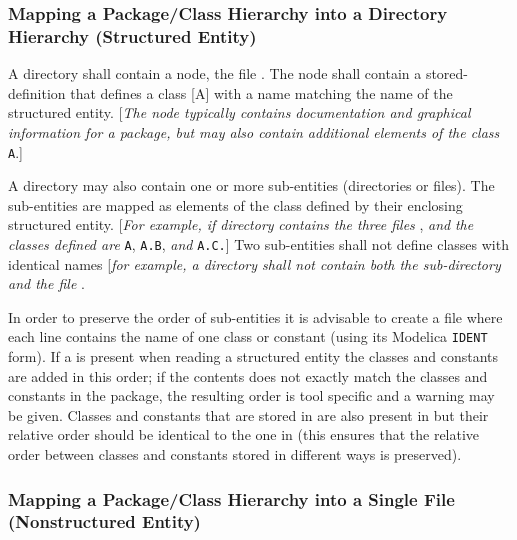 \subsubsection{Mapping a Package/Class Hierarchy into a Directory Hierarchy (Structured Entity)}

A directory shall contain a node, the file . The node shall contain a stored-definition that defines a class {[}A{]} with a name
matching the name of the structured entity. {[}\emph{The node typically
contains documentation and graphical information for a package, but may
also contain additional elements of the class} \lstinline!A!.{]}

A directory may also contain one or more sub-entities (directories or
files). The sub-entities are mapped as elements of the class defined by
their enclosing structured entity. {[}\emph{For example, if directory} 
\emph{contains the three files} ,  \emph{and}
\emph{the classes defined are} \lstinline!A!, \lstinline!A.B!, \emph{and} \lstinline!A.C.!{]} Two
sub-entities shall not define classes with identical names {[}\emph{for
example, a directory shall not contain both the sub-directory} 
\emph{and the file} \filename{A.mo}{]}.

In order to preserve the order of sub-entities it is advisable to create
a file  where each line contains the name of one class or
constant (using its Modelica \lstinline!IDENT! form). If a  is present when reading a structured entity
the classes and constants are added in this order; if the contents does
not exactly match the classes and constants in the package, the
resulting order is tool specific and a warning may be given. Classes and
constants that are stored in  are also present in
 but their relative order should be identical to the one in
 (this ensures that the relative order between classes and
constants stored in different ways is preserved).

\subsubsection{Mapping a Package/Class Hierarchy into a Single File (Nonstructured Entity)}


